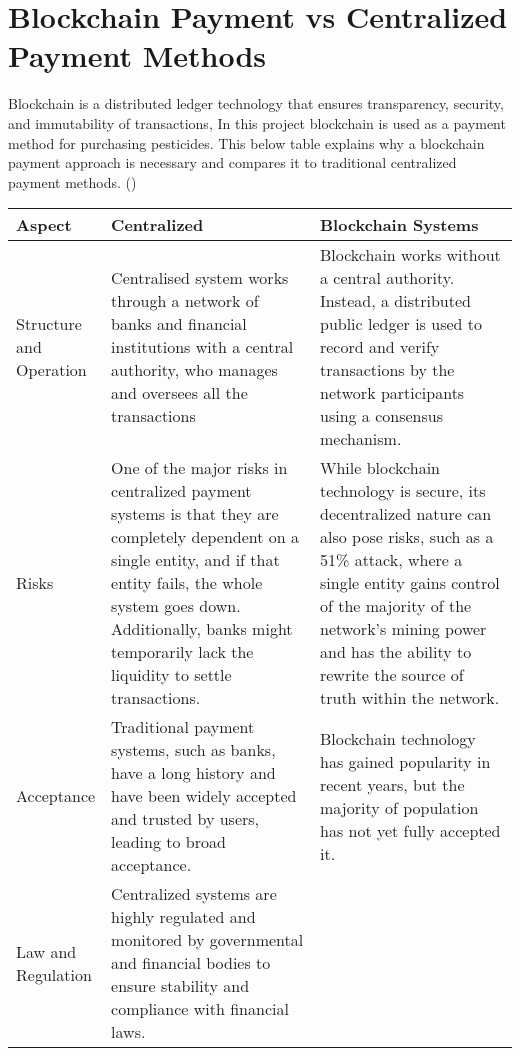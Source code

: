     
\section{Blockchain Payment vs Centralized Payment Methods}

Blockchain is a distributed ledger technology that ensures transparency, security, and immutability of transactions, In this project blockchain is used as a payment method for purchasing pesticides. This below table explains why a blockchain payment approach is necessary and compares it to traditional centralized payment methods. (\cite{centralised_vs_decentralised})

\begin{table}[H]
    \centering
    \begin{tabular}{|>{\centering\arraybackslash}p{0.12\linewidth}|p{0.45\linewidth}|p{0.45\linewidth}|} \hline 
    \textbf{Aspect} & \textbf{Centralized   } & \textbf{Blockchain Systems}\\
        \hline
        Structure and Operation  
        & 
        Centralised system works through a network of banks and financial institutions with a central authority, who manages and oversees all the transactions
        &
        Blockchain works without a central authority. Instead, a distributed public ledger is used to record and verify transactions by the network participants using a consensus mechanism.
        \\
        \hline
        Risks 
        & 
        One of the major risks in centralized payment systems is that they are completely dependent on a single entity, and if that entity fails, the whole system goes down. Additionally, banks might temporarily lack the liquidity to settle transactions.
        & 
        While blockchain technology is secure, its decentralized nature can also pose risks, such as a 51\% attack, where a single entity gains control of the majority of the network's mining power and has the ability to rewrite the source of truth within the network.
        \\
        \hline
        Acceptance 
        & 
        Traditional payment systems, such as banks, have a long history and have been widely accepted and trusted by users, leading to broad acceptance.
        & 
        Blockchain technology has gained popularity in recent years, but the majority of population has not yet fully accepted it.
        \\
        \hline
        Law and Regulation  
        & 
        Centralized systems are highly regulated and monitored by governmental and financial bodies to ensure stability and compliance with financial laws.

\end{tabular}
\end{table}
